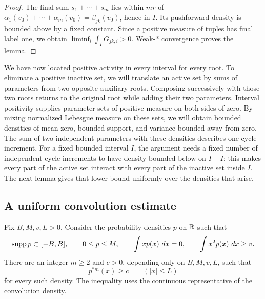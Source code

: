 \begin{proof}
The final sum $s_1+\cdots+s_m$ lies within $mr$ of
$\alpha_1(v_0)+\cdots+\alpha_m(v_0)=\beta_{jk}(v_0)$, hence in $I$.
Its pushforward density is bounded above by a fixed constant.  Since
a positive measure of tuples has final label one, we obtain
$\liminf_i\int_I G_{jk,i}>0$.  Weak-* convergence proves the lemma.
\end{proof}

We have now located positive activity in every interval for every root.
To eliminate a positive inactive set, we will translate an active set
by sums of parameters from two opposite auxiliary roots.  Composing
successively with those two roots returns to the original root while
adding their two parameters.  Interval positivity supplies parameter
sets of positive measure on both sides of zero.  By mixing normalized
Lebesgue measure on these sets, we will obtain bounded densities of
mean zero, bounded support, and variance bounded away from zero.
The sum of two independent parameters with these densities describes
one cycle increment.  For a fixed bounded interval
$I$, the argument needs a fixed number of independent cycle increments
to have density bounded below on $I-I$: this makes every part of the
active set interact with every part of the inactive set inside $I$.
The next lemma gives that lower bound uniformly over the densities
that arise.

\subsection{A uniform convolution estimate}

\begin{lemma}\label{lem:convolution}
Fix $B,M,v,L>0$.  Consider the probability densities $p$ on $\mathbb R$ such
that
\[
 \operatorname{supp} p\subset[-B,B],\qquad 0\leq p\leq M,
 \qquad \int x p(x)\,\mathop{}\!d x=0,
 \qquad \int x^2p(x)\,\mathop{}\!d x\geq v.
\]
There are an integer $m\geq2$ and $c>0$, depending only on
$B,M,v,L$, such that
\[
 p^{*m}(x)\geq c\qquad(|x|\leq L)
\]
for every such density.  The inequality uses the continuous representative
of the convolution density.
\end{lemma}

